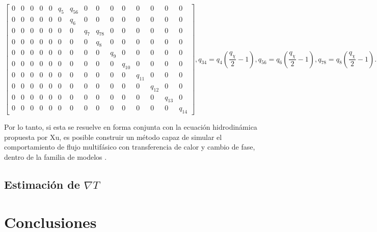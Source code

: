 \begin{subequations}
\begin{equation}
\begin{bmatrix}
		0 & 0 & 0 & 0 & 0 & q_5 & q_{56} & 0 & 0 & 0 & 0 & 0 & 0 & 0 & 0 \\
		0 & 0 & 0 & 0 & 0 & 0 & q_6 & 0 & 0 & 0 & 0 & 0 & 0 & 0 & 0 \\
		0 & 0 & 0 & 0 & 0 & 0 & 0 & q_7 & q_{78} & 0 & 0 & 0 & 0 & 0 & 0 \\
		0 & 0 & 0 & 0 & 0 & 0 & 0 & 0 & q_8 & 0 & 0 & 0 & 0 & 0 & 0 \\
		0 & 0 & 0 & 0 & 0 & 0 & 0 & 0 & 0 & q_{9} & 0 & 0 & 0 & 0 & 0 \\
		0 & 0 & 0 & 0 & 0 & 0 & 0 & 0 & 0 & 0 & q_{10} & 0 & 0 & 0 & 0 \\
		0 & 0 & 0 & 0 & 0 & 0 & 0 & 0 & 0 & 0 & 0 & q_{11} & 0 & 0 & 0 \\
		0 & 0 & 0 & 0 & 0 & 0 & 0 & 0 & 0 & 0 & 0 & 0 & q_{12} & 0 & 0 \\
		0 & 0 & 0 & 0 & 0 & 0 & 0 & 0 & 0 & 0 & 0 & 0 & 0 & q_{13} & 0 \\
		0 & 0 & 0 & 0 & 0 & 0 & 0 & 0 & 0 & 0 & 0 & 0 & 0 & 0 & q_{14}
		\end{bmatrix},	
	\end{equation}
	\begin{equation}
		q_{34} = q_4 \left( \dfrac{q_{\chi}}{2} - 1 \right),
	\end{equation}
	\begin{equation}
		q_{56} = q_6 \left( \dfrac{q_{\chi}}{2} - 1 \right),
	\end{equation}
	\begin{equation}
		q_{78} = q_8 \left( \dfrac{q_{\chi}}{2} - 1 \right).
	\end{equation}	
	\label{eq:modelo_3d_full}
\end{subequations}

Por lo tanto, si esta \lbe{} se resuelve en forma conjunta con la ecuaci\'on hidrodin\'amica propuesta por Xu, es posible construir un m\'etodo capaz de simular el comportamiento de flujo multif\'asico con transferencia de calor y cambio de fase, dentro de la familia de modelos \pp{}.

\subsection{Estimaci\'on de $\nabla T$}







\section{Conclusiones}